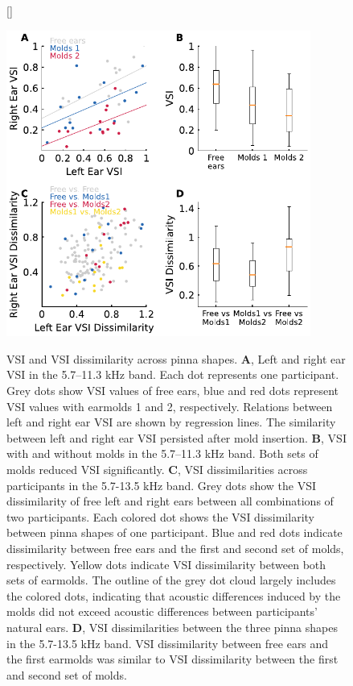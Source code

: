 \begin{figure}[t]
[\FBwidth]
{\caption{VSI and VSI dissimilarity across pinna shapes. \textbf{A}, Left and right ear VSI in the 5.7–11.3 kHz band. Each dot represents one participant. Grey dots show VSI values of free ears, blue and red dots represent VSI values with earmolds 1 and 2, respectively. Relations between left and right ear VSI are shown by regression lines. The similarity between left and right ear VSI persisted after mold insertion. \textbf{B}, VSI with and without molds in the 5.7–11.3 kHz band. Both sets of molds reduced VSI significantly. \textbf{C}, VSI dissimilarities across participants in the 5.7-13.5 kHz band. Grey dots show the VSI dissimilarity of free left and right ears between all combinations of two participants. Each colored dot shows the VSI dissimilarity between pinna shapes of one participant. Blue and red dots indicate dissimilarity between free ears and the first and second set of molds, respectively. Yellow dots indicate VSI dissimilarity between both sets of earmolds. The outline of the grey dot cloud largely includes the colored dots, indicating that acoustic differences induced by the molds did not exceed acoustic differences between participants' natural ears. \textbf{D}, VSI dissimilarities between the three pinna shapes in the 5.7-13.5 kHz band. VSI dissimilarity between free ears and the first earmolds was similar to VSI dissimilarity between the first and second set of molds.}
\label{fig:molds_vsi}}
{\includegraphics[width=10cm]{../Results/figures/fig4/fig4}}
\end{figure}

